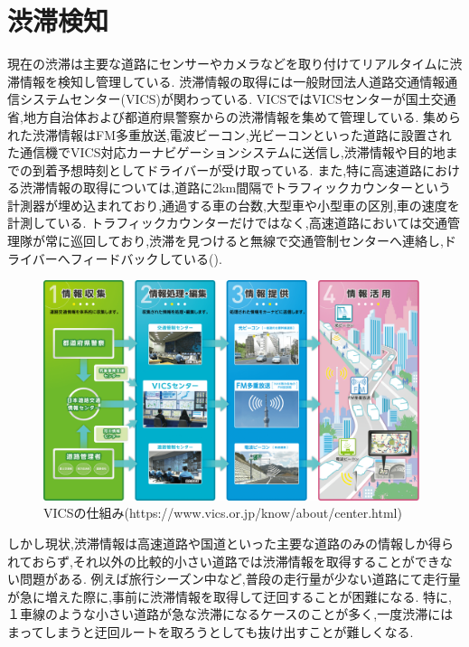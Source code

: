 \section{渋滞検知}
現在の渋滞は主要な道路にセンサーやカメラなどを取り付けてリアルタイムに渋滞情報を検知し管理している.
渋滞情報の取得には一般財団法人道路交通情報通信システムセンター(VICS)が関わっている.
VICSではVICSセンターが国土交通省,地方自治体および都道府県警察からの渋滞情報を集めて管理している.
集められた渋滞情報はFM多重放送,電波ビーコン,光ビーコンといった道路に設置された通信機でVICS対応カーナビゲーションシステムに送信し,渋滞情報や目的地までの到着予想時刻としてドライバーが受け取っている.
また,特に高速道路における渋滞情報の取得については,道路に2km間隔でトラフィックカウンターという計測器が埋め込まれており,通過する車の台数,大型車や小型車の区別,車の速度を計測している.
トラフィックカウンターだけではなく,高速道路においては交通管理隊が常に巡回しており,渋滞を見つけると無線で交通管制センターへ連絡し,ドライバーへフィードバックしている().

\begin{figure}[htbp]
  \begin{center}
   \includegraphics[width=11cm]{figs/vics.png}
  \end{center}
  \caption{VICSの仕組み(https://www.vics.or.jp/know/about/center.html)}
  \label{fig:vics_system}
\end{figure}

しかし現状,渋滞情報は高速道路や国道といった主要な道路のみの情報しか得られておらず,それ以外の比較的小さい道路では渋滞情報を取得することができない問題がある.
例えば旅行シーズン中など,普段の走行量が少ない道路にて走行量が急に増えた際に,事前に渋滞情報を取得して迂回することが困難になる.
特に,１車線のような小さい道路が急な渋滞になるケースのことが多く,一度渋滞にはまってしまうと迂回ルートを取ろうとしても抜け出すことが難しくなる.

